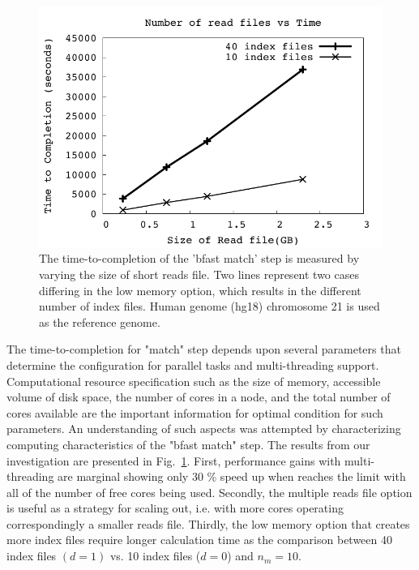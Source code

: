 \documentclass{acm_proc_article-sp}
\begin{document}
\begin{figure}
 \centering
\includegraphics[scale=0.66]{figures/readsvstime.pdf}

\caption{\small The time-to-completion of the 'bfast match' step is measured by varying the size of short reads file.  Two lines represent two cases differing in the low memory option, which results in the different number of index files.  Human genome (hg18) chromosome 21 is used as the reference genome.  }
  \label{fig:parallel-execution} 
 \end{figure}


The time-to-completion for "match" step depends upon several parameters that determine the configuration for parallel tasks and multi-threading support.  Computational resource specification such as the size of memory, accessible volume of disk space, the number of cores in a node, and the total number of cores available are the important information for optimal condition for such parameters.  An understanding of such aspects was attempted by characterizing computing characteristics of the "bfast match" step.  The results from our investigation are presented  in Fig.~\ref{fig:parallel-execution}. First, performance gains with multi-threading are marginal showing only 30 \% speed up when reaches the limit with all of the number of free cores being used.  
Secondly, the multiple reads file option is useful as a strategy for scaling out, i.e. with more cores operating correspondingly a smaller reads file.  Thirdly, the low memory option that creates more index files require longer calculation time as the comparison between 40 index files $(d = 1)$ vs. 10 index files ($ d = 0 $) and $n_m = 10$.   
\end{document}
